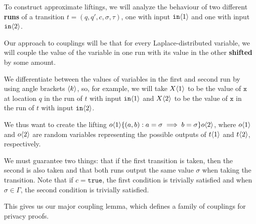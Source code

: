 To construct approximate liftings, we will analyze the behaviour of two different \textbf{runs} of a transition $t = (q, q', c, \sigma, \tau)$, one with input $\texttt{in}\langle1 \rangle$ and one with input $\texttt{in}\langle2 \rangle$. 

Our approach to couplings will be that for every Laplace-distributed variable, we will couple the value of the variable in one run with its value in the other \textbf{shifted} by some amount. 

We differentiate between the values of variables in the first and second run by using angle brackets $\langle k \rangle$, so, for example, we will take $X\langle1 \rangle$ to be the value of $\texttt{x}$ at location $q$ in the run of $t$ with input $\texttt{in}\langle1 \rangle$ and $X\langle2 \rangle$ to be the value of $\texttt{x}$ in the run of $t$ with input $\texttt{in}\langle2 \rangle$. 

We thus want to create the lifting $o\langle1 \rangle\{(a, b): a=\sigma\implies b=\sigma\}o\langle2 \rangle$, where $o\langle1 \rangle$ and $o\langle2 \rangle$ are random variables representing the possible outputs of $t\langle1 \rangle$ and $t\langle2 \rangle$, respectively.

We must guarantee two things: that if the first transition is taken, then the second is also taken and that both runs output the same value $\sigma$ when taking the transition. Note that if $c = \texttt{true}$, the first condition is trivially satisfied and when $\sigma\in \Gamma$, the second condition is trivially satisfied. 

This gives us our major coupling lemma, which defines a family of couplings for privacy proofs.

